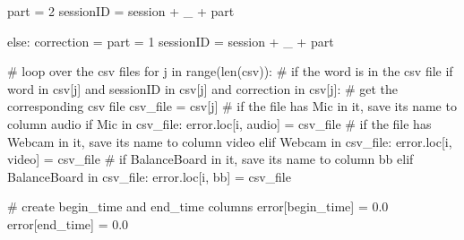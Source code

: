 \documentclass[
  letterpaper,
  DIV=11,
  numbers=noendperiod]{scrreprt}
\newenvironment{Shaded}{\begin{snugshade}}{\end{snugshade}}
\newcommand{\BuiltInTok}[1]{\textcolor[rgb]{0.00,0.23,0.31}{#1}}
\newcommand{\CommentTok}[1]{\textcolor[rgb]{0.37,0.37,0.37}{#1}}
\newcommand{\ControlFlowTok}[1]{\textcolor[rgb]{0.00,0.23,0.31}{#1}}
\newcommand{\FloatTok}[1]{\textcolor[rgb]{0.68,0.00,0.00}{#1}}
\newcommand{\KeywordTok}[1]{\textcolor[rgb]{0.00,0.23,0.31}{#1}}
\newcommand{\NormalTok}[1]{\textcolor[rgb]{0.00,0.23,0.31}{#1}}
\newcommand{\OperatorTok}[1]{\textcolor[rgb]{0.37,0.37,0.37}{#1}}
\newcommand{\StringTok}[1]{\textcolor[rgb]{0.13,0.47,0.30}{#1}}
\begin{document}
\begin{Shaded}
\begin{Highlighting}[]
\NormalTok{            part }\OperatorTok{=} \StringTok{\textquotesingle{}2\textquotesingle{}}
\NormalTok{            sessionID }\OperatorTok{=}\NormalTok{ session }\OperatorTok{+} \StringTok{\textquotesingle{}\_\textquotesingle{}} \OperatorTok{+}\NormalTok{ part}

        \ControlFlowTok{else}\NormalTok{:}
\NormalTok{            correction }\OperatorTok{=} \StringTok{\textquotesingle{}\textquotesingle{}}
\NormalTok{            part }\OperatorTok{=} \StringTok{\textquotesingle{}1\textquotesingle{}}
\NormalTok{            sessionID }\OperatorTok{=}\NormalTok{ session }\OperatorTok{+} \StringTok{\textquotesingle{}\_\textquotesingle{}} \OperatorTok{+}\NormalTok{ part}

        \CommentTok{\# loop over the csv files}
        \ControlFlowTok{for}\NormalTok{ j }\KeywordTok{in} \BuiltInTok{range}\NormalTok{(}\BuiltInTok{len}\NormalTok{(csv)):}
            \CommentTok{\# if the word is in the csv file}
            \ControlFlowTok{if}\NormalTok{ word }\KeywordTok{in}\NormalTok{ csv[j] }\KeywordTok{and}\NormalTok{ sessionID }\KeywordTok{in}\NormalTok{ csv[j] }\KeywordTok{and}\NormalTok{ correction }\KeywordTok{in}\NormalTok{ csv[j]:}
                \CommentTok{\# get the corresponding csv file}
\NormalTok{                csv\_file }\OperatorTok{=}\NormalTok{ csv[j]}
                \CommentTok{\# if the file has Mic in it, save its name to column audio}
                \ControlFlowTok{if} \StringTok{\textquotesingle{}Mic\textquotesingle{}} \KeywordTok{in}\NormalTok{ csv\_file:}
\NormalTok{                    error.loc[i, }\StringTok{\textquotesingle{}audio\textquotesingle{}}\NormalTok{] }\OperatorTok{=}\NormalTok{ csv\_file}
                \CommentTok{\# if the file has Webcam in it, save its name to column video}
                \ControlFlowTok{elif} \StringTok{\textquotesingle{}Webcam\textquotesingle{}} \KeywordTok{in}\NormalTok{ csv\_file:}
\NormalTok{                    error.loc[i, }\StringTok{\textquotesingle{}video\textquotesingle{}}\NormalTok{] }\OperatorTok{=}\NormalTok{ csv\_file}
                \CommentTok{\# if BalanceBoard in it, save its name to column bb}
                \ControlFlowTok{elif} \StringTok{\textquotesingle{}BalanceBoard\textquotesingle{}} \KeywordTok{in}\NormalTok{ csv\_file:}
\NormalTok{                    error.loc[i, }\StringTok{\textquotesingle{}bb\textquotesingle{}}\NormalTok{] }\OperatorTok{=}\NormalTok{ csv\_file}


    \CommentTok{\# create begin\_time and end\_time columns}
\NormalTok{    error[}\StringTok{\textquotesingle{}begin\_time\textquotesingle{}}\NormalTok{] }\OperatorTok{=} \FloatTok{0.0}
\NormalTok{    error[}\StringTok{\textquotesingle{}end\_time\textquotesingle{}}\NormalTok{] }\OperatorTok{=} \FloatTok{0.0}


\end{Highlighting}
\end{Shaded}
\end{document}
